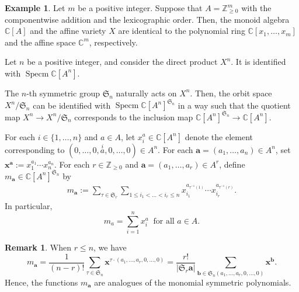 \documentclass[12pt,a4paper]{amsart}
\theoremstyle{definition}
\newtheorem{rem}[thm]{Remark}
\newtheorem{ex}[thm]{Example}
\numberwithin{equation}{subsection}
\begin{document}
\begin{ex}
  Let $m$ be a positive integer.
  Suppose that $A = \mathbb{Z}_{\geq 0}^m$ with the componentwise addition and the lexicographic order.
  Then, the monoid algebra $\mathbb{C}[A]$ and the affine variety $X$ are identical to the polynomial ring $\mathbb{C}[x_1,\dots,x_m]$ and the affine space $\mathbb{C}^m$, respectively.
\end{ex}

Let $n$ be a positive integer, and consider the direct product $X^n$.
It is identified with $\operatorname{Specm} \mathbb{C}[A^n]$.

The $n$-th symmetric group $\mathfrak{S}_n$ naturally acts on $X^n$.
Then, the orbit space $X^n/\mathfrak{S}_n$ can be identified with $\operatorname{Specm} \mathbb{C}[A^n]^{\mathfrak{S}_n}$ in a way such that the quotient map $X^n \to X^n/\mathfrak{S}_n$ corresponds to the inclusion map $\mathbb{C}[A^n]^{\mathfrak{S}_n} \to \mathbb{C}[A^n]$.

For each $i \in \{ 1,\dots,n \}$ and $a \in A$, let $x_i^a \in \mathbb{C}[A^n]$ denote the element corresponding to $(0,\dots,0,\overset{i}{a},0,\dots,0) \in A^n$.
For each $\mathbf{a} = (a_1,\dots,a_n) \in A^n$, set $\mathbf{x}^\mathbf{a} := x_1^{a_1} \cdots x_n^{a_n}$.
For each $r \in \mathbb{Z}_{\geq 0}$ and $\mathbf{a} = (a_1,\dots,a_r) \in A^r$, define $m_\mathbf{a} \in \mathbb{C}[A^n]^{\mathfrak{S}_n}$ by
\begin{align}\label{eq: def of m_bfa}
  m_\mathbf{a} := \sum_{\tau \in \mathfrak{S}_r} \sum_{1 \leq i_1 < \dots < i_r \leq n} x_{i_1}^{a_{\tau^{-1}(1)}} \cdots x_{i_r}^{a_{\tau^{-1}(r)}}.
\end{align}
In particular,
\[
  m_a = \sum_{i=1}^n x_i^a \ \text{ for all } a \in A.
\]

\begin{rem}\label{rem: da are monomial symm poly}
  When $r \leq n$, we have
  \[
    m_\mathbf{a} = \frac{1}{(n-r)!} \sum_{\tau \in \mathfrak{S}_n} \mathbf{x}^{\tau \cdot (a_1,\dots,a_r,0,\dots,0)} = \frac{r!}{|\mathfrak{S}_r \mathbf{a}|} \sum_{\mathbf{b} \in \mathfrak{S}_n (a_1,\dots,a_r,0,\dots,0)} \mathbf{x}^\mathbf{b}.
  \]
  Hence, the functions $m_\mathbf{a}$ are analogues of the monomial symmetric polynomials.
\end{rem}
\end{document}
